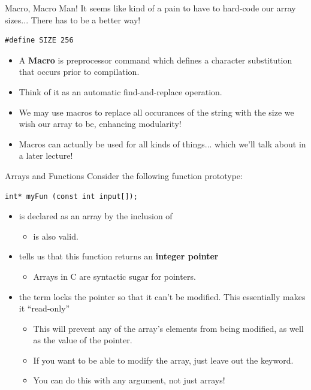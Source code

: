 \documentclass[11pt]{beamer}
\let\OldTexttt\texttt
\renewcommand{\texttt}[1]{\OldTexttt{\color{teal}{#1}}}
\begin{document}
\begin{frame}[fragile=singleslide]{Macro, Macro Man!}
It seems like kind of a pain to have to hard-code our array sizes... There has to be a better way! 
\begin{lstlisting}[style=C]
#define SIZE 256
\end{lstlisting}
\begin{itemize}
\item A \textbf{Macro} is preprocessor command which defines a character substitution that occurs prior to compilation.  
\item Think of it as an automatic find-and-replace operation.
\item We may use macros to replace all occurances of the string \texttt{SIZE} with the size we wish our array to be, enhancing modularity! 
\item Macros can actually be used for all kinds of things... which we'll talk about in a later lecture! 
\end{itemize}
\end{frame}

\begin{frame}[fragile=singleslide]{Arrays and Functions}
Consider the following function prototype:
\begin{lstlisting}[style=C]
int* myFun (const int input[]);
\end{lstlisting}
\begin{itemize}
\item \texttt{input} is declared as an array by the inclusion of \texttt{[]}
\begin{itemize}
\item \texttt{int*} is also valid.
\end{itemize}
\item \texttt{int*} tells us that this function returns an \textbf{integer pointer}
\begin{itemize}
\item Arrays in C are syntactic sugar for pointers.
\end{itemize}
\item the \texttt{const} term locks the pointer so that it can't be modified.  This essentially makes it ``read-only''
\begin{itemize}
\item This will prevent any of the array's elements from being modified, as well as the value of the pointer.  
\item If you want to be able to modify the array, just leave out the \texttt{const} keyword.
\item You can do this with any argument, not just arrays!
\end{itemize}
\end{itemize}
\end{frame}
\end{document}
